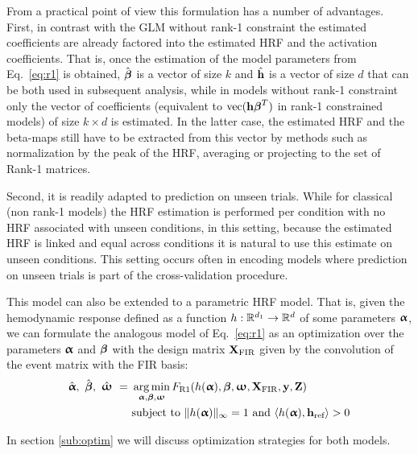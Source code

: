 From a practical point of view this formulation has a number of advantages.
First, in contrast with the GLM without rank-1 constraint the estimated
coefficients are already factored into the estimated HRF and the activation
coefficients. That is, once the estimation of the model parameters
from Eq.~\eqref{eq:r1} is obtained, $\hat{{\boldsymbol \beta}}$ is a vector of size $k$ and $\hat{\mathbf{h}}$ is a
vector of size $d$ that can be both used in subsequent analysis, while in models
without rank-1 constraint only the vector of coefficients (equivalent to 
$\text{vec}(\mathbf{h} {\boldsymbol \beta}^T)$ in rank-1 constrained models) of size $k
\times d$ is estimated. In the latter case, the estimated HRF and the beta-maps
still have to be extracted from this vector by methods such as normalization by the peak of the HRF,
averaging or projecting to the set of Rank-1 matrices.

Second, it is readily adapted to prediction on unseen trials. While for
classical (non rank-1 models) the HRF estimation is performed per condition with no HRF associated with unseen conditions, in this setting, because the
estimated HRF is linked and equal across conditions it is natural to use this
estimate on unseen conditions. This setting occurs often in encoding models 
where prediction on unseen trials is part of the cross-validation procedure.

This model can also be extended to a parametric HRF model. That is,
given the hemodynamic response defined as a function $h: {\mathbb R}^{d_1} \to {\mathbb R}^d$ of some parameters
${\boldsymbol \upalpha}$, we can formulate the analogous model of Eq.~\eqref{eq:r1} as an
optimization over the parameters ${\boldsymbol \upalpha}$ and ${\boldsymbol \beta}$ with the design matrix
$\mathbf{X}_{\text{FIR}}$ given by the convolution of the event matrix with the FIR basis:
%
\begin{eqnarray}
\label{eq:r1_parametric}
\begin{aligned}
\hat{\bfalpha}, ~\hat{\bfbeta}, ~\hat{\bfomega} ~=~&\argmin_{\bfalpha, \bfbeta, \bfomega} 
F_{\text{R1}}(h(\bfalpha), \bfbeta, \bfomega, \B{X}_{\text{FIR}}, \B{y}, \B{Z}) \\
&\text{subject to } \| h(\bfalpha)\|_{\infty} = 1  \text{ and } \langle h(\bfalpha), \B{h}_{\text{ref}} \rangle > 0
\end{aligned}
\end{eqnarray}

In section \ref{sub:optim} we will discuss optimization strategies for both
models.


